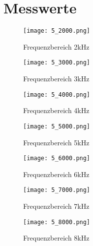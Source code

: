 \section{Messwerte}
\label{chap:VERSUCH_5_MESSWERTE}

\begin{figure}[H]
\centering
\texttt{[image: 5\_2000.png]}
\caption{Frequenzbereich 2kHz}
\label{fig:F2}
\end{figure}
\begin{figure}[H]
\centering
\texttt{[image: 5\_3000.png]}
\caption{Frequenzbereich 3kHz}
\label{fig:F3}
\end{figure}
\begin{figure}[H]
\centering
\texttt{[image: 5\_4000.png]}
\caption{Frequenzbereich 4kHz}
\label{fig:F4}
\end{figure}
\begin{figure}[H]
\centering
\texttt{[image: 5\_5000.png]}
\caption{Frequenzbereich 5kHz}
\label{fig:F5}
\end{figure}
\begin{figure}[H]
\centering
\texttt{[image: 5\_6000.png]}
\caption{Frequenzbereich 6kHz}
\label{fig:F6}
\end{figure}
\begin{figure}[H]
\centering
\texttt{[image: 5\_7000.png]}
\caption{Frequenzbereich 7kHz}
\label{fig:F7}
\end{figure}
\begin{figure}[H]
\centering
\texttt{[image: 5\_8000.png]}
\caption{Frequenzbereich 8kHz}
\label{fig:F8}
\end{figure}

\newpage

